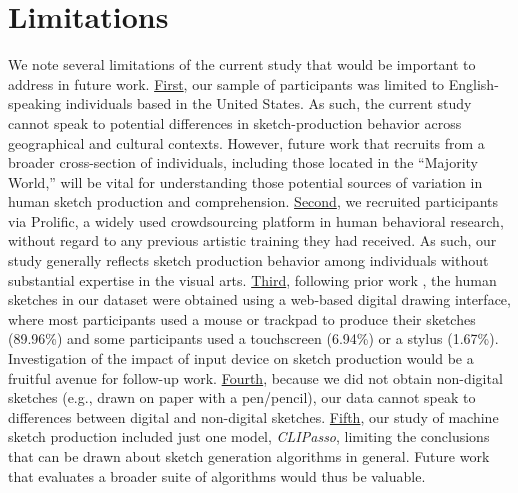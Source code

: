 \documentclass{article}
\begin{document}
\vspace{-1em}
\section{Limitations}
\vspace{-1em}
We note several limitations of the current study that would be important to address in future work. 
\underline{First}, our sample of participants was limited to English-speaking individuals based in the United States. As such, the current study cannot speak to potential differences in sketch-production behavior across geographical and cultural contexts. 
However, future work that recruits from a broader cross-section of individuals, including those located in the ``Majority World,'' will be vital for understanding those potential sources of variation in human sketch production and comprehension. 
\underline{Second}, we recruited participants via Prolific, a widely used crowdsourcing platform in human behavioral research, without regard to any previous artistic training they had received. As such, our study generally reflects sketch production behavior among individuals without substantial expertise in the visual arts.
\underline{Third}, following prior work \cite{fan2018common, fan2020pragmatic, hawkins2023visual,yu2016sketch,jongejan2017quick, long2021parallel}, the human sketches in our dataset were obtained using a web-based digital drawing interface, where most participants used a mouse or trackpad to produce their sketches (89.96\%) and some participants used a touchscreen (6.94\%) or a stylus (1.67\%). 
Investigation of the impact of input device on sketch production would be a fruitful avenue for follow-up work. 
\underline{Fourth}, because we did not obtain non-digital sketches (e.g., drawn on paper with a pen/pencil), our data cannot speak to differences between digital and non-digital sketches.
\underline{Fifth}, our study of machine sketch production included just one model, \textit{CLIPasso}, limiting the conclusions that can be drawn about sketch generation algorithms in general. Future work that evaluates a broader suite of algorithms would thus be valuable. 
\end{document}
